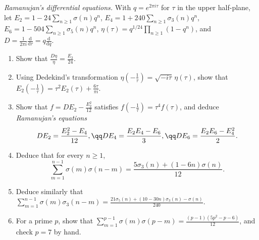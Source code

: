 \begin{exercise}[Journey]\label{pb:ramanujanE2}
\emph{Ramanujan's differential equations.} With $q=e^{2\pi i\tau}$ for $\tau$ in the upper half-plane, let $E_2=1-24\sum_{n\ge1}\sigma(n)q^n$, $E_4=1+240\sum_{n\ge1}\sigma_3(n)q^n$,
$E_6=1-504\sum_{n\ge1}\sigma_5(n)q^n$, $\eta(\tau)=q^{1/24}\prod_{n\ge1}(1-q^n)$, and $D=\frac1{2\pi i}\frac{\mathrm d}{\mathrm d\tau}=q\frac{\mathrm d}{\mathrm dq}$.
\begin{enumerate}[label=(\alph*)]
\item Show that $\frac{D\eta}\eta=\frac{E_2}{24}$.
\item Using Dedekind's transformation $\eta(-\frac1\tau)=\sqrt{-i\tau}\,\eta(\tau)$, show that $E_2(-\frac1\tau)=\tau^2E_2(\tau)+\frac{6\tau}{\pi i}$.
\item Show that $f=DE_2-\frac{E_2^2}{12}$ satisfies $f(-\frac1\tau)=\tau^4f(\tau)$, and deduce \emph{Ramanujan's equations}
\[
DE_2=\frac{E_2^2-E_4}{12},\qq DE_4=\frac{E_2E_4-E_6}3,\qq DE_6=\frac{E_2E_6-E_4^2}2.
\]
\item Deduce that for every $n\ge1$,
\[
\sum_{m=1}^{n-1}\sigma(m)\sigma(n-m)=\frac{5\sigma_3(n)+(1-6n)\sigma(n)}{12}.
\]
\item Deduce similarly that $\sum_{m=1}^{n-1}\sigma(m)\sigma_3(n-m)=\frac{21\sigma_5(n)+(10-30n)\sigma_3(n)-\sigma(n)}{240}$.
\item For a prime $p$, show that $\sum_{m=1}^{p-1}\sigma(m)\sigma(p-m)=\frac{(p-1)(5p^2-p-6)}{12}$, and check $p=7$ by hand.
\end{enumerate}
\end{exercise}

